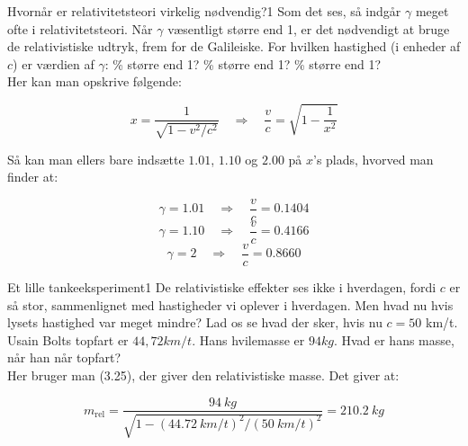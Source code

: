 \documentclass[crop=false, class=memoir]{standalone}
\begin{document}
\begin{opgave}{Hvornår er relativitetsteori virkelig nødvendig?}{1}
	Som det ses, så indgår $\gamma$ meget ofte i relativitetsteori. Når $\gamma$ væsentligt større end 1, er det
	nødvendigt at bruge de relativistiske udtryk, frem for de Galileiske. For hvilken hastighed (i enheder af $c$) er
	værdien af $\gamma$:
	\% større end 1?
	\% større end 1?
	\% større end 1?\\
	
	Her kan man opskrive følgende:
	
	$$x = \frac{1}{\sqrt{1- v^2/c^2}} \quad \Rightarrow \quad \frac{v}{c} = \sqrt{1- \frac{1}{x^2}}$$
	
	
	\noindent
	Så kan man ellers bare indsætte $1.01$, $1.10$ og $2.00$ på $x$'s plads, hvorved man finder at:
	
	$$\gamma = 1.01 \quad \Rightarrow \quad \frac{v}{c} = 0.1404 $$
	$$\gamma = 1.10 \quad \Rightarrow \quad \frac{v}{c} = 0.4166 $$
	$$\gamma = 2 \quad \Rightarrow \quad \frac{v}{c} = 0.8660 $$
\end{opgave}

\begin{opgave}{Et lille tankeeksperiment}{1}
	De relativistiske effekter ses ikke i hverdagen, fordi $c$ er så stor, sammenlignet med hastigheder vi oplever i
	hverdagen. Men hvad nu hvis lysets hastighed var meget mindre? Lad os se hvad der sker, hvis nu $c = 50$
	km/t.
	\opg Usain Bolts topfart er $44,72 \si{km/t}$. Hans hvilemasse er $94 \si{kg}$. Hvad er hans masse, når han når
	topfart?\\
	
	Her bruger man (3.25), der giver den relativistiske masse. Det giver at:
	
	$$m_{\text{rel}} = \frac{\SI{94}{kg}}{\sqrt{1- (\SI{44.72}{km/t})^2 / (\SI{50}{km/t})^2}} =  \SI{210.2}{kg} $$
\end{opgave}
\end{document}
